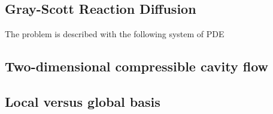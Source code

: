 \subsection{Gray-Scott Reaction Diffusion}

The problem is described with the following system of PDE

\subsection{Two-dimensional compressible cavity flow}



\subsection{Local versus global basis}


